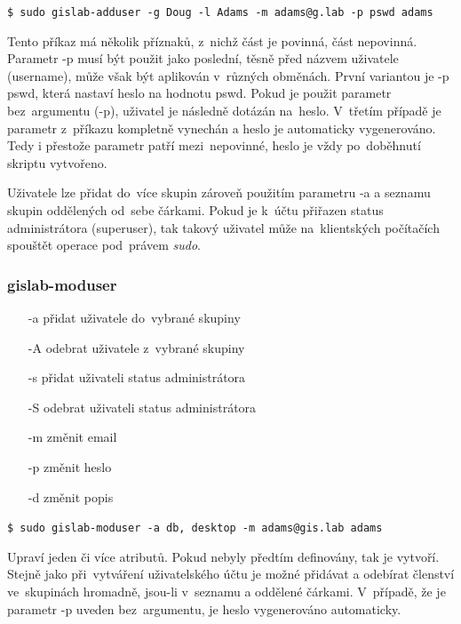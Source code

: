 \begin{center}
\texttt{\$ sudo gislab-adduser -g Doug -l Adams -m adams@g.lab -p pswd adams}
\end{center}

Tento příkaz má několik příznaků, z~nichž část je povinná, část
nepovinná. Parametr \textsf{-p} musí být použit jako poslední, těsně
před názvem uživatele (username), může však být aplikován v~různých
obměnách. První variantou je \textsf{-p pswd}, která nastaví heslo
na hodnotu pswd. Pokud je použit parametr bez~argumentu
(\textsf{-p}), uživatel je následně dotázán na~heslo. V~třetím případě
je parametr z~příkazu kompletně vynechán a heslo je automaticky
vygenerováno. Tedy i přestože parametr patří mezi~nepovinné, heslo je
vždy po~doběhnutí skriptu vytvořeno.

Uživatele lze přidat do~více skupin zároveň použitím parametru
\textsf{-a} a seznamu skupin oddělených od~sebe čárkami. Pokud je 
k~účtu přiřazen status administrátora (superuser), tak takový uživatel
může na~klientských počítačích spouštět operace pod~právem
\textit{sudo}.

\subsubsection{gislab-moduser}
\begin{itemize}
\item [-a] přidat uživatele do~vybrané skupiny
\item [-A] odebrat uživatele z~vybrané skupiny
\item [-s] přidat uživateli status administrátora
\item [-S] odebrat uživateli status administrátora
\item [-m] změnit email
\item [-p] změnit heslo
\item [-d] změnit popis
\end{itemize}

\begin{center}
\texttt{\$ sudo gislab-moduser -a db, desktop -m adams@gis.lab adams}
\end{center}

Upraví jeden či více atributů. Pokud nebyly předtím definovány, tak je
vytvoří. Stejně jako při~vytváření uživatelského účtu je možné
přidávat a odebírat členství ve~skupinách hromadně, jsou-li v~seznamu
a oddělené čárkami. V~případě, že je parametr \textsf{-p} uveden 
bez~argumentu, je heslo vygenerováno automaticky.

